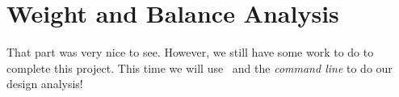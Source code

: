 \section{Weight and Balance Analysis}

That part was very nice to see. However, we still have some work to do to
complete this project. This time we will use \PY\ and the {\it command line} to
do our design analysis!


